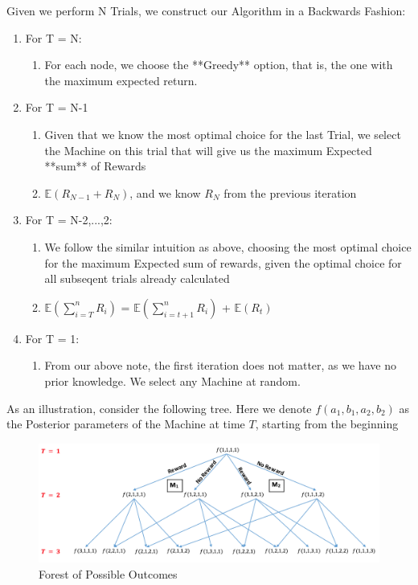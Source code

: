 \documentclass{article}
\begin{document}
Given we perform N Trials, we construct our Algorithm in a Backwards Fashion:\\

\begin{enumerate}
\item For T = N:
	\begin{enumerate}
	\item For each node, we choose the **Greedy** option, that is, the one with the maximum expected return.
	\end{enumerate}
\item For T = N-1
	\begin{enumerate}
	\item Given that we know the most optimal choice for the last Trial, we select the Machine on this trial that will give us the maximum Expected **sum** of Rewards\
	\item $\mathbb{E}(R_{N-1} + R_{N})$, and we know $R_N$ from the previous iteration
	\end{enumerate}
\item For T = N-2,...,2:
	\begin{enumerate}
	\item We follow the similar intuition as above, choosing the most optimal choice for the maximum Expected sum of rewards, given the optimal choice for all subseqent trials already calculated
	\item $\mathbb{E}(\displaystyle\sum_{i=T}^{n} R_i)$ = $\mathbb{E}(\displaystyle\sum_{i=t+1}^{n} R_i)$ + $\mathbb{E}(R_t)$
	\end{enumerate}
\item For T = 1:
	\begin{enumerate}
	\item From our above note, the first iteration does not matter, as we have no prior knowledge. We select any Machine at random.
	\end{enumerate}
\end{enumerate}

As an illustration, consider the following tree. Here we denote $f(a_1, b_1, a_2, b_2)$ as the Posterior parameters of the Machine at time $T$, starting from the beginning\\

\begin{figure}[H]
\centering
\includegraphics[scale=0.75]{Dynamic_Programming_Tree.png}
\caption{Forest of Possible Outcomes}
\end{figure}
\end{document}
